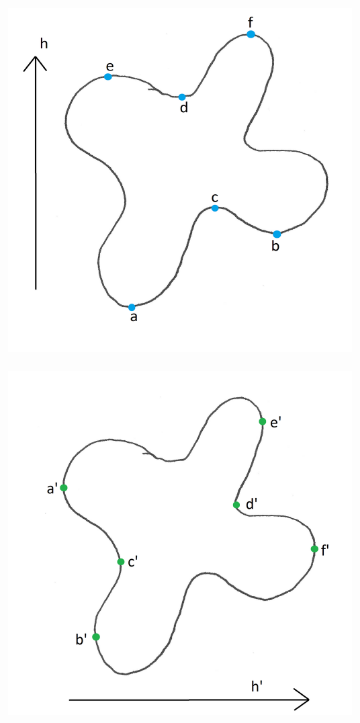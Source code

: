 \documentclass{article}
\begin{document}
\begin{figure}
	\centering
	\begin{subfigure}{0.32\columnwidth}
		\centering
		\includegraphics[width=\textwidth]{fig/blobby-molecule-h-vertical}
	\end{subfigure}
	\begin{subfigure}{0.32\columnwidth}
		\centering
		\includegraphics[width=\textwidth]{fig/blobby-molecule-h-horizontal}

\end{subfigure}
\end{figure}
\end{document}
